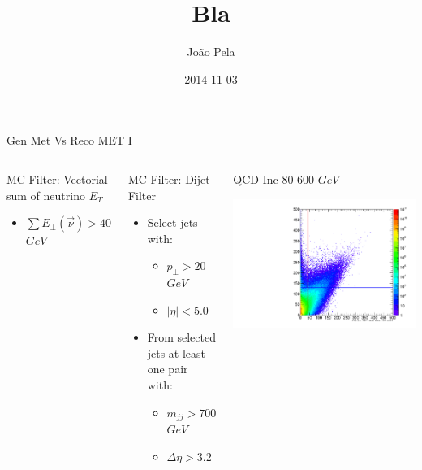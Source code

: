 \documentclass[8pt]{beamer}
\author[J. Pela]{João Pela}
\title[BLA]{Bla}
\institute[ICL]{Imperial College London}
\date{2014-11-03}
\begin{document}
\begin{frame}{Gen Met Vs Reco MET I}
 
\begin{columns}

 
\begin{block}{\begin{tiny}MC Filter: Vectorial sum of neutrino $E_T$\end{tiny}}


\begin{itemize}
  \item $\sum E_\perp(\vec{\nu}) > 40$ $GeV$
\end{itemize}

\end{block}

\begin{block}{\begin{tiny}MC Filter: Dijet Filter\end{tiny}}

  \begin{itemize}
    \item Select jets with:
    \begin{itemize}
      \item $p_\perp>20$ $GeV$
      \item $|\eta|<5.0$
    \end{itemize}
    \item From selected jets at least one pair with:
    \begin{itemize}
      \item $m_{jj}>700$ $GeV$
      \item $\Delta\eta>3.2$
    \end{itemize}  
  \end{itemize}

\end{block}


\begin{block}{QCD Inc 80-600 $GeV$}
 
\centering
 
\includegraphics[width=0.7\linewidth]{img/MC_QCDIncAll_GenVsReco_met}
 

\end{block}
\end{columns}
\end{frame}
\end{document}
